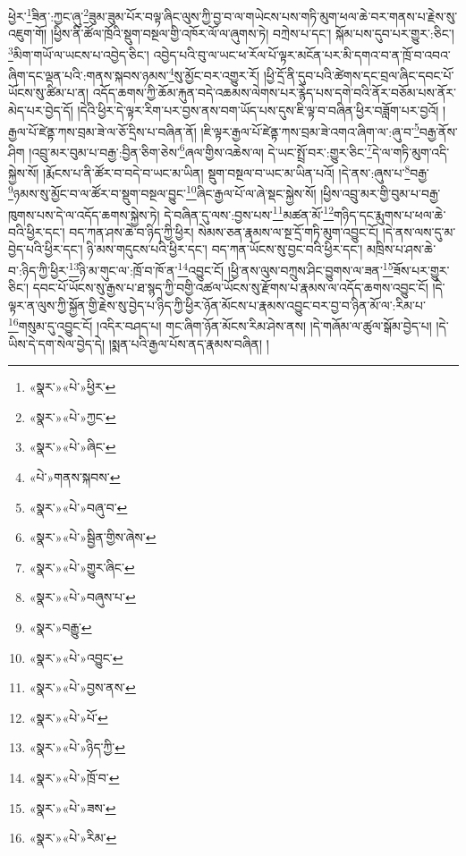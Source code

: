 ཕྱེར་\footnote{«སྣར་»«པེ་»ཕྱིར་}ཟིན་:ཀྱང་ཞུ་\footnote{«སྣར་»«པེ་»ཀྱང་}ཟུམ་ཟུམ་པོར་བལྟ་ཞིང་ལུས་ཀྱི་བྱ་བ་ལ་གཡེངས་པས་གཏི་མུག་ཕལ་ཆེ་བར་གནས་པ་རྗེས་སུ་འཇུག་གོ། །ཕྱིས་ནི་ཚོལ་ཁྲོའི་སྡུག་བསྔལ་གྱི་འཁོར་ལོ་ལ་ཞུགས་ཏེ། བཀྲེས་པ་དང་། སྐོམ་པས་དུབ་པར་གྱུར་:ཅིང་། \footnote{«སྣར་»«པེ་»ཞིང་}མིག་གཡོ་ལ་ཡངས་པ་འབྱེད་ཅིང་། འབྱེད་པའི་བུ་ལ་ཡང་ཕ་རོལ་པོ་ལྟར་མངོན་པར་མི་དགའ་བ་ན་ཁྲོ་བ་འབའ་ཞིག་དང་ལྡན་པའི་:གནས་སྐབས་ཉམས་\footnote{«པེ་»གནས་སྐབས་}སུ་མྱོང་བར་འགྱུར་རོ། །ཕྱི་དྲོ་ནི་དུབ་པའི་ཚེགས་དང་བྲལ་ཞིང་དབང་པོ་ཡོངས་སུ་ཚིམ་པ་ན། འདོད་ཆགས་ཀྱི་ཆོམ་རྐུན་བདེ་འཆམས་ལེགས་པར་རྙེད་པས་དགེ་བའི་ནོར་བཅོམ་པས་ནོར་མེད་པར་བྱེད་དོ། །དེའི་ཕྱིར་དེ་ལྟར་རིག་པར་བྱས་ནས་བག་ཡོད་པས་དུས་ཇི་ལྟ་བ་བཞིན་ཕྱིར་བཟློག་པར་བྱའོ། །རྒྱལ་པོ་ཛེནྟ་ཀས་བྲམ་ཟེ་ལ་ཅོ་དྲིས་པ་བཞིན་ནོ། །ཇི་ལྟར་རྒྱལ་པོ་ཛེནྟ་ཀས་བྲམ་ཟེ་འགའ་ཞིག་ལ་:ཞུ་བ་\footnote{«སྣར་»«པེ་»བཞུ་བ་}བརྒྱ་ནོས་ཤིག །འབྲུ་མར་བུམ་པ་བརྒྱ་:བྱིན་ཅིག་ཅེས་\footnote{«སྣར་»«པེ་»སྦྱིན་གྱིས་ཞེས་}ཞལ་གྱིས་འཆེས་ལ། དེ་ཡང་སྤྲོ་བར་:གྱུར་ཅིང་\footnote{«སྣར་»«པེ་»གྱུར་ཞིང་}དེ་ལ་གཏི་མུག་འདི་སྐྱེས་སོ། །རྨོངས་པ་ནི་ཚོར་བ་བདེ་བ་ཡང་མ་ཡིན། སྡུག་བསྔལ་བ་ཡང་མ་ཡིན་པའོ། །དེ་ནས་:ཞུས་པ་\footnote{«སྣར་»«པེ་»བཞུས་པ་}བརྒྱ་\footnote{«སྣར་»བརྒྱུ་}ཉམས་སུ་མྱོང་བ་ལ་ཚོར་བ་སྡུག་བསྔལ་བྱུང་\footnote{«སྣར་»«པེ་»འབྱུང་}ཞིང་རྒྱལ་པོ་ལ་ཞེ་སྡང་སྐྱེས་སོ། །ཕྱིས་འབྲུ་མར་གྱི་བུམ་པ་བརྒྱ་ཁུགས་པས་དེ་ལ་འདོད་ཆགས་སྐྱེས་ཏེ། དེ་བཞིན་དུ་ལས་:བྱས་པས་\footnote{«སྣར་»«པེ་»བྱས་ནས་}མཚན་མོ་\footnote{«སྣར་»«པེ་»པོ་}གཉིད་དང་རྨུགས་པ་ཕལ་ཆེ་བའི་ཕྱིར་དང་། བད་ཀན་ཤས་ཆེ་བ་ཉིད་ཀྱི་ཕྱིར། སེམས་ཅན་རྣམས་ལ་སྔ་དྲོ་གཏི་མུག་འབྱུང་ངོ། །དེ་ནས་ལས་དུ་མ་བྱེད་པའི་ཕྱིར་དང་། ཉི་མས་གདུངས་པའི་ཕྱིར་དང་། བད་ཀན་ཡོངས་སུ་བྱང་བའི་ཕྱིར་དང་། མཁྲིས་པ་ཤས་ཆེ་བ་:ཉིད་ཀྱི་ཕྱིར་\footnote{«སྣར་»«པེ་»ཉིད་ཀྱི་}ཉི་མ་གུང་ལ་:ཁྲོ་བ་ཁོ་ན་\footnote{«སྣར་»«པེ་»ཁྲོ་བ་}འབྱུང་ངོ། །ཕྱི་ནས་ལུས་བཀྲུས་ཤིང་བྱུགས་ལ་ཟན་\footnote{«སྣར་»«པེ་»ཟས་}ཟོས་པར་གྱུར་ཅིང་། དབང་པོ་ཡོངས་སུ་རྒྱས་པ་ཐ་སྙད་ཀྱི་བགྱི་འཚལ་ཡོངས་སུ་རྫོགས་པ་རྣམས་ལ་འདོད་ཆགས་འབྱུང་ངོ། །དེ་ལྟར་ན་ལུས་ཀྱི་སྐྱོན་གྱི་རྗེས་སུ་བྱེད་པ་ཉིད་ཀྱི་ཕྱིར་ཉོན་མོངས་པ་རྣམས་འབྱུང་བར་བྱ་བ་ཉིན་མོ་ལ་:རིམ་པ་\footnote{«སྣར་»«པེ་»རིམ་}གསུམ་དུ་འབྱུང་ངོ། །འདིར་བཤད་པ། གང་ཞིག་ཉོན་མོངས་རིམ་ཤེས་ནས། །དེ་གཞོམ་ལ་ཚུལ་སྒོམ་བྱེད་པ། །དེ་ཡིས་དེ་དག་སེལ་བྱེད་དེ། །སྨན་པའི་རྒྱལ་པོས་ནད་རྣམས་བཞིན། །
